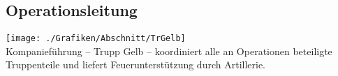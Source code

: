 \subsection{Operationsleitung}
\texttt{[image: ./Grafiken/Abschnitt/TrGelb]}\\
Kompanieführung -- Trupp Gelb -- koordiniert alle an Operationen beteiligte Truppenteile und liefert Feuerunterstützung durch Artillerie.